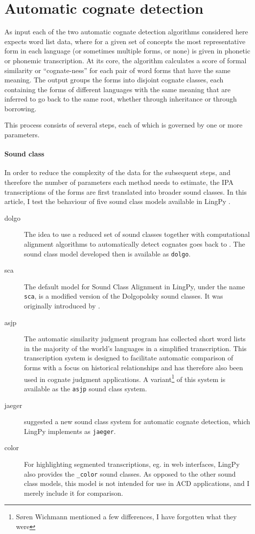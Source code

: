\documentclass[a4paper,11pt,twocolumn]{scrartcl}
\begin{document}
\section{Automatic cognate detection}
\label{acd}
As input each of the two automatic cognate detection algorithms considered here
expects word list data, where for a given set of concepts the most
representative form in each language (or sometimes multiple forms, or none) is
given in phonetic or phonemic transcription. At its core, the algorithm
calculates a score of formal similarity or “cognate-ness” for each pair of word
forms that have the same meaning. The output groups the forms into disjoint
cognate classes, each containing the forms of different languages with the same
meaning that are inferred to go back to the same root, whether through
inheritance or through borrowing.

This process consists of several steps, each of which is governed by one or more parameters.

\paragraph{Sound class}
In order to reduce the complexity of the data for the subsequent steps, and
therefore the number of parameters each method needs to estimate, the IPA
transcriptions of the forms are first translated into broader sound classes. In
this article, I test the behaviour of five sound class models available in
LingPy \parencite{lingpy26}.
\begin{description}
\item[dolgo] The idea to use a reduced set of sound classes together with
  computational alignment algorithms to automatically detect cognates goes back
  to \textcite{dolgopolsky}. The sound class model developed then is available
  as \verb|dolgo|.
\item[sca] The default model for Sound Class Alignment in LingPy, under the name
  \verb|sca|, is a modified version of the Dolgopolsky sound classes. It was
  originally introduced by \textcite{list2012sca}.
\item[asjp] The automatic similarity judgment program \parencite{asjp} has
  collected short word lists in the majority of the world's languages in a
  simplified transcription. This transcription system is designed to facilitate
  automatic comparison of forms with a focus on historical relationships and has
  therefore also been used in cognate judgment applications. A
  variant\footnote{Søren Wichmann mentioned a few differences, I have forgotten
    what they were} of this system is available as the \verb|asjp| sound class
  system.
\item[jaeger] \Textcite{jaeger} suggested a new sound class system for automatic
  cognate detection, which LingPy implements as \verb|jaeger|.
\item[\textunderscore{}color] For highlighting segmented transcriptions, eg. in web interfaces,
  LingPy also provides the \verb|_color| sound classes. As opposed to the other
  sound class models, this model is not intended for use in ACD applications,
  and I merely include it for comparison.
\end{description}
\end{document}

